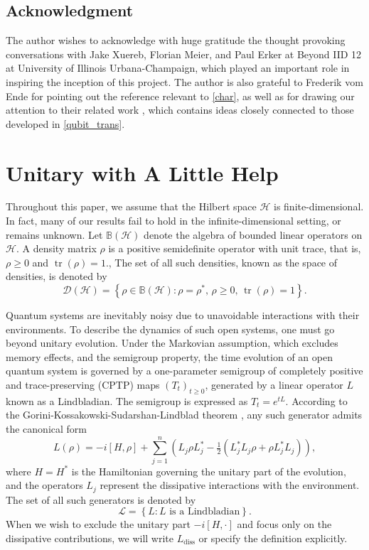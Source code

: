 \documentclass[11pt,reqno]{amsart}
\theoremstyle{definition}
\newcommand{\mb}{\mathbb}
\newcommand{\mc}{\mathcal}
\newcommand{\lset}{\left\{ }
\newcommand{\rset}{\right\} }
\newcommand{\lpara}{\left(}
\newcommand{\rpara}{\right)}
\DeclareMathOperator{\tr}{tr}
\begin{document}
\subsection*{Acknowledgment}
The author wishes to acknowledge with huge gratitude the thought provoking conversations with Jake Xuereb, Florian Meier, and Paul Erker at Beyond IID 12 at University of Illinois Urbana-Champaign, which played an important role in inspiring the inception of this project. The author is also grateful to Frederik vom Ende for pointing out the reference \cite{hiriart2004} relevant to \cref{char}, as well as for drawing our attention to their related work \cite{dirr2019}, which contains ideas closely connected to those developed in \cref{qubit_trans}.


\section{Unitary with A Little Help}\label{uni+diss}
Throughout this paper, we assume that the Hilbert space $\mc H$ is finite-dimensional. In fact, many of our results fail to hold in the infinite-dimensional setting, or remains unknown.
Let $\mb B(\mc H)$ denote the algebra of bounded linear operators on $\mc H$. A density matrix $\rho$ is a positive semidefinite operator with unit trace, that is, $\rho \ge 0$ and $\tr(\rho) = 1$.,
The set of all such densities, known as the space of densities, is denoted by 
$$\mc D(\mc H) = \lset \rho \in \mb B(\mc H) : \rho = \rho^*,\, \rho \ge 0,\, \tr(\rho) = 1\rset .$$

Quantum systems are inevitably noisy due to unavoidable interactions with their environments. To describe the dynamics of such open systems, one must go beyond unitary evolution. Under the Markovian assumption, which excludes memory effects, and the semigroup property, the time evolution of an open quantum system is governed by a one-parameter semigroup of completely positive and trace-preserving (CPTP) maps $(T_t)_{t \ge 0}$, generated by a linear operator $L$ known as a Lindbladian. The semigroup is expressed as $T_t = e^{tL}$. According to the Gorini-Kossakowski-Sudarshan-Lindblad theorem \cite{gorini1976,lindblad1976}, any such generator admits the canonical form
\[
L(\rho) = -i[H, \rho] + \sum_{j=1}^n \lpara L_j \rho L_j^* - \tfrac{1}{2}\lpara L_j^*L_j\rho+\rho L_j^*L_j\rpara \rpara,
\]
where $H = H^*$ is the Hamiltonian governing the unitary part of the evolution, and the operators $L_j$ represent the dissipative interactions with the environment. The set of all such generators is denoted by
$$\mc L = \lset L : L \text{ is a Lindbladian}\rset.$$
When we wish to exclude the unitary part $-i[H, \cdot]$ and focus only on the dissipative contributions, we will write $L_{\mathrm{diss}}$ or specify the definition explicitly.
\end{document}
